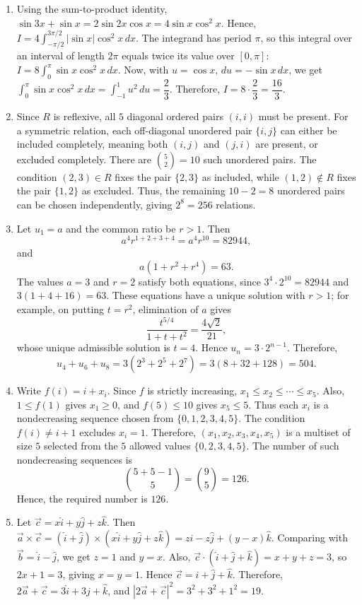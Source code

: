 \documentclass[11pt,a4paper]{article}
\begin{document}
\begin{enumerate}
\item Using the sum-to-product identity, \(\sin 3x+\sin x=2\sin 2x\cos x=4\sin x\cos^2x\). Hence, \(I=4\int_{-\pi/2}^{3\pi/2}|\sin x|\cos^2x\,dx\). The integrand has period \(\pi\), so this integral over an interval of length \(2\pi\) equals twice its value over \([0,\pi]\): \(I=8\int_0^\pi \sin x\cos^2x\,dx\). Now, with \(u=\cos x\), \(du=-\sin x\,dx\), we get \(\int_0^\pi\sin x\cos^2x\,dx=\int_{-1}^{1}u^2\,du=\dfrac{2}{3}\). Therefore, \(I=8\cdot\dfrac{2}{3}=\dfrac{16}{3}\).
\item Since $R$ is reflexive, all $5$ diagonal ordered pairs $(i,i)$ must be present. For a symmetric relation, each off-diagonal unordered pair $\{i,j\}$ can either be included completely, meaning both $(i,j)$ and $(j,i)$ are present, or excluded completely. There are $\binom{5}{2}=10$ such unordered pairs. The condition $(2,3)\in R$ fixes the pair $\{2,3\}$ as included, while $(1,2)\notin R$ fixes the pair $\{1,2\}$ as excluded. Thus, the remaining $10-2=8$ unordered pairs can be chosen independently, giving $2^8=256$ relations.
\item Let $u_1=a$ and the common ratio be $r>1$. Then
\[
a^4r^{1+2+3+4}=a^4r^{10}=82944,
\]
and
\[
a(1+r^2+r^4)=63.
\]
The values $a=3$ and $r=2$ satisfy both equations, since $3^4\cdot2^{10}=82944$ and $3(1+4+16)=63$. These equations have a unique solution with $r>1$; for example, on putting $t=r^2$, elimination of $a$ gives
\[
\frac{t^{5/4}}{1+t+t^2}=\frac{4\sqrt{2}}{21},
\]
whose unique admissible solution is $t=4$. Hence $u_n=3\cdot2^{n-1}$. Therefore,
\[
u_4+u_6+u_8=3(2^3+2^5+2^7)=3(8+32+128)=504.
\]
\item Write $f(i)=i+x_i$. Since $f$ is strictly increasing, $x_1\le x_2\le\cdots\le x_5$. Also, $1\le f(1)$ gives $x_1\ge0$, and $f(5)\le10$ gives $x_5\le5$. Thus each $x_i$ is a nondecreasing sequence chosen from $\{0,1,2,3,4,5\}$. The condition $f(i)\neq i+1$ excludes $x_i=1$. Therefore, $(x_1,x_2,x_3,x_4,x_5)$ is a multiset of size $5$ selected from the $5$ allowed values $\{0,2,3,4,5\}$. The number of such nondecreasing sequences is \[\binom{5+5-1}{5}=\binom{9}{5}=126.\] Hence, the required number is $126$.
\item Let $\vec c=x\hat i+y\hat j+z\hat k$. Then $\vec a\times\vec c=(\hat i+\hat j)\times(x\hat i+y\hat j+z\hat k)=z\hat i-z\hat j+(y-x)\hat k$. Comparing with $\vec b=\hat i-\hat j$, we get $z=1$ and $y=x$. Also, $\vec c\cdot(\hat i+\hat j+\hat k)=x+y+z=3$, so $2x+1=3$, giving $x=y=1$. Hence $\vec c=\hat i+\hat j+\hat k$. Therefore, $2\vec a+\vec c=3\hat i+3\hat j+\hat k$, and $\left|2\vec a+\vec c\right|^2=3^2+3^2+1^2=19$.

\end{enumerate}
\end{document}
